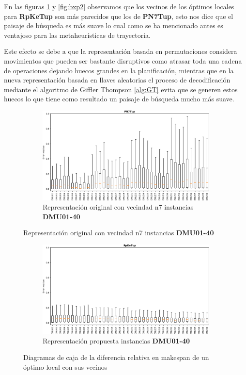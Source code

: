 En las figuras \ref{fig:bxp1} y \ref{fig:bxp2} observamos que los vecinos de los óptimos locales para \textbf{RpKeTup} son más parecidos que los de \textbf{PN7Tup}, esto nos dice que el paisaje de búsqueda es más suave lo cual como se ha mencionado antes es ventajoso para las metaheurísticas de trayectoria.  

Este efecto se debe a que la representación basada en permutaciones considera movimientos que pueden ser bastante disruptivos como atrasar toda una cadena de operaciones dejando huecos grandes en la planificación, mientras que en la nueva representación basada en llaves aleatorias el proceso de decodificación mediante el algoritmo de Giffler Thompson \ref{alg:GT} evita que se generen estos huecos lo que tiene como resultado un paisaje de búsqueda mucho más suave.
\begin{figure}[hbtp]
    \begin{subfigure}{\textwidth}
        \centering
        \includegraphics[scale=.6]{Imagenes/bxpn7_1.png}
        \caption{Representación original con vecindad n7 instancias \textbf{DMU01-40}}
    \end{subfigure}
\end{figure}
\begin{figure}[H]\ContinuedFloat
    \begin{subfigure}{\textwidth}
        \centering
        \includegraphics[scale=.6]{Imagenes/bxppr_1.png}
        \caption{Representación propuesta instancias \textbf{DMU01-40}}
    \end{subfigure}
    \caption{Diagramas de caja de la diferencia relativa en makespan de un óptimo local con sus vecinos}
    \label{fig:bxp1}
\end{figure}


